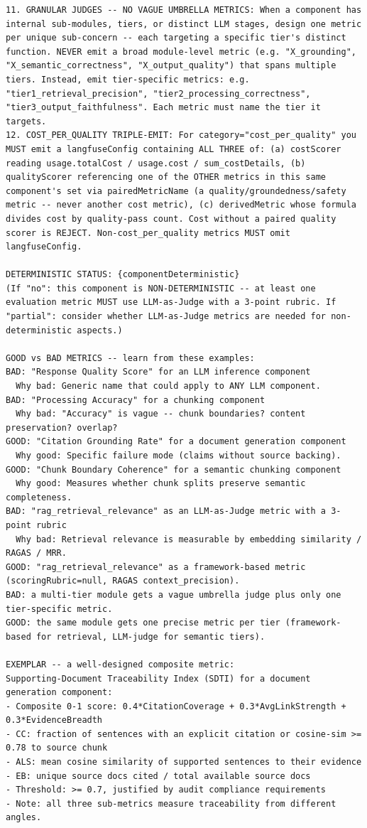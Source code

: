 \documentclass[11pt]{article}
\begin{document}
\begin{lstlisting}[style=prompt]
11. GRANULAR JUDGES -- NO VAGUE UMBRELLA METRICS: When a component has internal sub-modules, tiers, or distinct LLM stages, design one metric per unique sub-concern -- each targeting a specific tier's distinct function. NEVER emit a broad module-level metric (e.g. "X_grounding", "X_semantic_correctness", "X_output_quality") that spans multiple tiers. Instead, emit tier-specific metrics: e.g. "tier1_retrieval_precision", "tier2_processing_correctness", "tier3_output_faithfulness". Each metric must name the tier it targets.
12. COST_PER_QUALITY TRIPLE-EMIT: For category="cost_per_quality" you MUST emit a langfuseConfig containing ALL THREE of: (a) costScorer reading usage.totalCost / usage.cost / sum_costDetails, (b) qualityScorer referencing one of the OTHER metrics in this same component's set via pairedMetricName (a quality/groundedness/safety metric -- never another cost metric), (c) derivedMetric whose formula divides cost by quality-pass count. Cost without a paired quality scorer is REJECT. Non-cost_per_quality metrics MUST omit langfuseConfig.

DETERMINISTIC STATUS: {componentDeterministic}
(If "no": this component is NON-DETERMINISTIC -- at least one evaluation metric MUST use LLM-as-Judge with a 3-point rubric. If "partial": consider whether LLM-as-Judge metrics are needed for non-deterministic aspects.)

GOOD vs BAD METRICS -- learn from these examples:
BAD: "Response Quality Score" for an LLM inference component
  Why bad: Generic name that could apply to ANY LLM component.
BAD: "Processing Accuracy" for a chunking component
  Why bad: "Accuracy" is vague -- chunk boundaries? content preservation? overlap?
GOOD: "Citation Grounding Rate" for a document generation component
  Why good: Specific failure mode (claims without source backing).
GOOD: "Chunk Boundary Coherence" for a semantic chunking component
  Why good: Measures whether chunk splits preserve semantic completeness.
BAD: "rag_retrieval_relevance" as an LLM-as-Judge metric with a 3-point rubric
  Why bad: Retrieval relevance is measurable by embedding similarity / RAGAS / MRR.
GOOD: "rag_retrieval_relevance" as a framework-based metric (scoringRubric=null, RAGAS context_precision).
BAD: a multi-tier module gets a vague umbrella judge plus only one tier-specific metric.
GOOD: the same module gets one precise metric per tier (framework-based for retrieval, LLM-judge for semantic tiers).

EXEMPLAR -- a well-designed composite metric:
Supporting-Document Traceability Index (SDTI) for a document generation component:
- Composite 0-1 score: 0.4*CitationCoverage + 0.3*AvgLinkStrength + 0.3*EvidenceBreadth
- CC: fraction of sentences with an explicit citation or cosine-sim >= 0.78 to source chunk
- ALS: mean cosine similarity of supported sentences to their evidence
- EB: unique source docs cited / total available source docs
- Threshold: >= 0.7, justified by audit compliance requirements
- Note: all three sub-metrics measure traceability from different angles.


\end{lstlisting}
\end{document}
